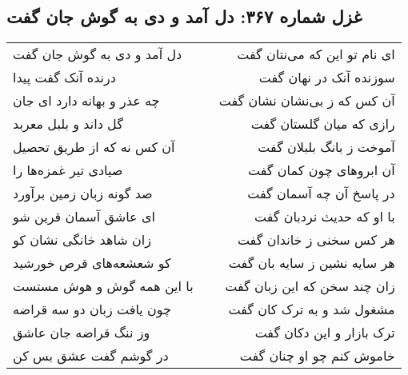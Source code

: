 \begin{center}
\section*{غزل شماره ۳۶۷: دل آمد و دی به گوش جان گفت}
\label{sec:0367}
\begin{longtable}{l p{0.5cm} r}
دل آمد و دی به گوش جان گفت
&&
ای نام تو این که می‌نتان گفت
\\
درنده آنک گفت پیدا
&&
سوزنده آنک در نهان گفت
\\
چه عذر و بهانه دارد ای جان
&&
آن کس که ز بی‌نشان نشان گفت
\\
گل داند و بلبل معربد
&&
رازی که میان گلستان گفت
\\
آن کس نه که از طریق تحصیل
&&
آموخت ز بانگ بلبلان گفت
\\
صیادی تیر غمزه‌ها را
&&
آن ابروهای چون کمان گفت
\\
صد گونه زبان زمین برآورد
&&
در پاسخ آن چه آسمان گفت
\\
ای عاشق آسمان قرین شو
&&
با او که حدیث نردبان گفت
\\
زان شاهد خانگی نشان کو
&&
هر کس سخنی ز خاندان گفت
\\
کو شعشعه‌های قرص خورشید
&&
هر سایه نشین ز سایه بان گفت
\\
با این همه گوش و هوش مستست
&&
زان چند سخن که این زبان گفت
\\
چون یافت زبان دو سه قراضه
&&
مشغول شد و به ترک کان گفت
\\
وز ننگ قراضه جان عاشق
&&
ترک بازار و این دکان گفت
\\
در گوشم گفت عشق بس کن
&&
خاموش کنم چو او چنان گفت
\\
\end{longtable}
\end{center}
